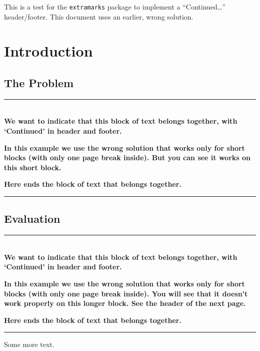 \documentclass[openany]{book}
\begin{document}
\tableofcontents

\bigskip

This is a test for the \texttt{extramarks} package to implement a ``Continued\ldots'' header/footer. This document uses an earlier, wrong solution.

\newpage
{}
\chapter{Introduction}

\lipsum[1]

\section{The Problem}
\label{sec:problem}
\noindent\rule{\textwidth}{1mm}\\
\textbf{We want to indicate that this block of text belongs together, with `Continued' in header and footer.}

\textbf{In this example we use the wrong solution that works only for short blocks (with only one page break inside). But you can see it works on this short block.}

\lipsum[1]

\textbf{Here ends the  block of text that belongs together.}\\
\noindent\rule{\textwidth}{1mm}
\extramarks{}{}
\lipsum[2-4]

\section{Evaluation}
\noindent\rule{\textwidth}{1mm}\\
\textbf{We want to indicate that this block of text belongs together, with `Continued' in header and footer.}

\textbf{In this example we use the wrong solution that works only for short blocks (with only one page break inside). You will see that it doesn't work properly on this longer block. See the header of the next page.}

\lipsum[3-9]

\textbf{Here ends the  block of text that belongs together.}\\
\noindent\rule{\textwidth}{1mm}
\extramarks{}{}

Some more text.
\end{document}
